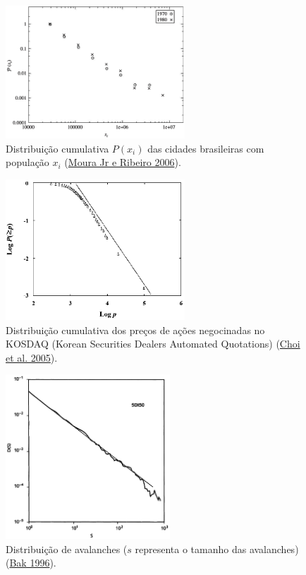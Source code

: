 \documentclass[
  ignorenonframetext,
  aspectratio=169]{beamer}
\begin{document}
\begin{frame}
\begin{figure}
\centering
\includegraphics[width=0.6\textwidth,height=\textheight]{ribeiro-pop-cidades.png}
\caption{Distribuição cumulativa \(P(x_i)\) das cidades brasileiras com
população \(x_i\) (\protect\hyperlink{ref-moura2006zipf}{Moura Jr e
Ribeiro 2006}).}
\end{figure}
\end{frame}

\begin{frame}
\begin{figure}
\centering
\includegraphics[width=0.6\textwidth,height=\textheight]{choi-koren-stock.png}
\caption{Distribuição cumulativa dos preços de ações negocinadas no
KOSDAQ (Korean Securities Dealers Automated Quotations)
(\protect\hyperlink{ref-choi2005}{Choi et al. 2005}).}
\end{figure}
\end{frame}

\begin{frame}
\begin{figure}
\centering
\includegraphics[width=0.55\textwidth,height=\textheight]{bak-avalanches.png}
\caption{Distribuição de avalanches (\(s\) representa o tamanho das
avalanches) (\protect\hyperlink{ref-perbak}{Bak 1996}).}
\end{figure}
\end{frame}
\end{document}

